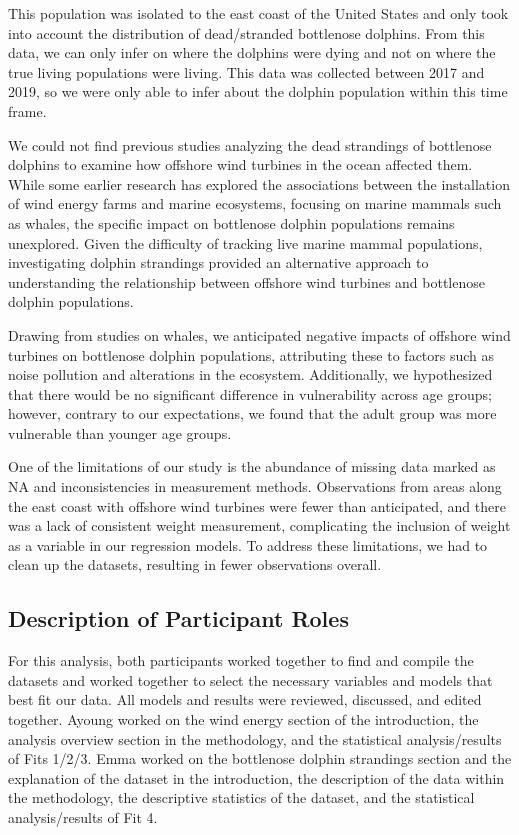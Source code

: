 \documentclass[
]{article}
\begin{document}
This population was isolated to the east coast of the United States and
only took into account the distribution of dead/stranded bottlenose
dolphins. From this data, we can only infer on where the dolphins were
dying and not on where the true living populations were living. This
data was collected between 2017 and 2019, so we were only able to infer
about the dolphin population within this time frame.

We could not find previous studies analyzing the dead strandings of
bottlenose dolphins to examine how offshore wind turbines in the ocean
affected them. While some earlier research has explored the associations
between the installation of wind energy farms and marine ecosystems,
focusing on marine mammals such as whales, the specific impact on
bottlenose dolphin populations remains unexplored. Given the difficulty
of tracking live marine mammal populations, investigating dolphin
strandings provided an alternative approach to understanding the
relationship between offshore wind turbines and bottlenose dolphin
populations.

Drawing from studies on whales, we anticipated negative impacts of
offshore wind turbines on bottlenose dolphin populations, attributing
these to factors such as noise pollution and alterations in the
ecosystem. Additionally, we hypothesized that there would be no
significant difference in vulnerability across age groups; however,
contrary to our expectations, we found that the adult group was more
vulnerable than younger age groups.

One of the limitations of our study is the abundance of missing data
marked as NA and inconsistencies in measurement methods. Observations
from areas along the east coast with offshore wind turbines were fewer
than anticipated, and there was a lack of consistent weight measurement,
complicating the inclusion of weight as a variable in our regression
models. To address these limitations, we had to clean up the datasets,
resulting in fewer observations overall.

\hypertarget{description-of-participant-roles}{%
\subsection{Description of Participant
Roles}\label{description-of-participant-roles}}

For this analysis, both participants worked together to find and compile
the datasets and worked together to select the necessary variables and
models that best fit our data. All models and results were reviewed,
discussed, and edited together. Ayoung worked on the wind energy section
of the introduction, the analysis overview section in the methodology,
and the statistical analysis/results of Fits 1/2/3. Emma worked on the
bottlenose dolphin strandings section and the explanation of the dataset
in the introduction, the description of the data within the methodology,
the descriptive statistics of the dataset, and the statistical
analysis/results of Fit 4.
\end{document}
